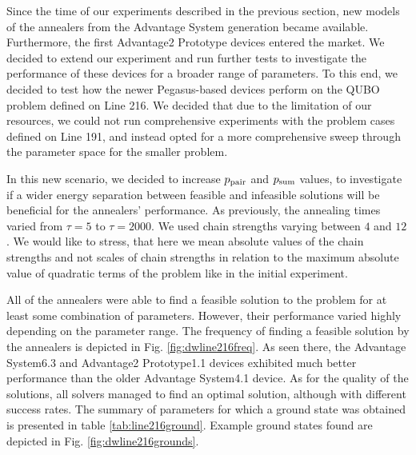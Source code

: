 Since the time of our experiments described in the previous section, new models
of the annealers from the Advantage System generation became available.
Furthermore, the first Advantage2 Prototype devices entered the market. We
decided to extend our experiment and run further tests to investigate the
performance of these devices for a broader range of parameters. To this end, we
decided to test how the newer Pegasus-based devices perform on the QUBO problem
defined on Line 216. We decided that due to the limitation of our resources, we
could not run comprehensive experiments with the problem cases defined on Line
191, and instead opted for a more comprehensive sweep through the parameter
space for the smaller problem.

In this new scenario, we decided to increase $p_{\text{pair}}$ and $p_{\text{sum}}$ values, to
investigate if a wider energy separation between feasible and infeasible
solutions will be beneficial for the annealers' performance. As previously, the
annealing times varied from $\tau=5$ to $\tau=2000$. We used chain strengths
varying between $4$ and $12$. We would like to stress, that here we mean
absolute values of the chain strengths and not scales of chain strengths in
relation to the maximum absolute value of quadratic terms of the problem like
in the initial experiment.

All of the annealers were able to find a feasible solution to the problem for
at least some combination of parameters. However, their performance varied
highly depending on the parameter range. The frequency of finding a feasible
solution by the annealers is depicted in Fig. \ref{fig:dwline216freq}. As seen
there, the Advantage System6.3 and Advantage2 Prototype1.1 devices exhibited
much better performance than the older Advantage System4.1 device. As for the
quality of the solutions, all solvers managed to find an optimal solution,
although with different success rates. The summary of parameters for which a
ground state was obtained is presented in table \ref{tab:line216ground}.
Example ground states found are depicted in Fig. \ref{fig:dwline216grounds}.

